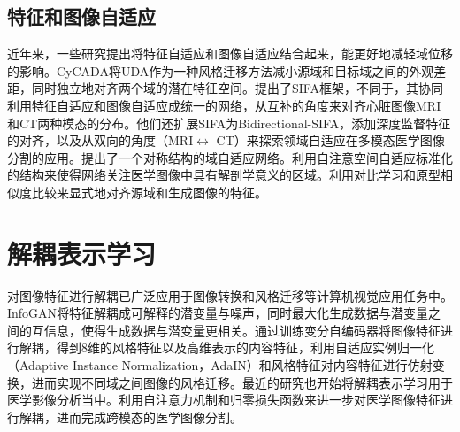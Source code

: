 \subsection{特征和图像自适应}
近年来，一些研究提出将特征自适应和图像自适应结合起来，能更好地减轻域位移的影响\cite{hoffman2018cycada,chen2019synergistic}。CyCADA\cite{hoffman2018cycada}将UDA作为一种风格迁移方法减小源域和目标域之间的外观差距，同时独立地对齐两个域的潜在特征空间。\citeauthor{chen2019synergistic}\cite{chen2019synergistic}提出了SIFA框架，不同于\cite{hoffman2018cycada}，其协同利用特征自适应和图像自适应成统一的网络，从互补的角度来对齐心脏图像MRI和CT两种模态的分布。他们还扩展SIFA为Bidirectional-SIFA\cite{chen2020unsupervised}，添加深度监督特征的对齐，以及从双向的角度（MRI$\leftrightarrow$ CT）来探索领域自适应在多模态医学图像分割的应用。\citeauthor{han2021deep}\cite{han2021deep}提出了一个对称结构的域自适应网络。\citeauthor{tomar2021self}\cite{tomar2021self}利用自注意空间自适应标准化的结构来使得网络关注医学图像中具有解剖学意义的区域。\citeauthor{ye2021unsupervised}\cite{ye2021unsupervised}利用对比学习和原型相似度比较来显式地对齐源域和生成图像的特征。

\section{解耦表示学习}
对图像特征进行解耦已广泛应用于图像转换和风格迁移等计算机视觉应用任务中\cite{DRIT, DRIT_plus}。InfoGAN\cite{chen2016infogan}将特征解耦成可解释的潜变量与噪声，同时最大化生成数据与潜变量之间的互信息，使得生成数据与潜变量更相关。\citeauthor{yang2019unsupervised}\cite{yang2019unsupervised}通过训练变分自编码器将图像特征进行解耦，得到8维的风格特征以及高维表示的内容特征，利用自适应实例归一化（Adaptive Instance Normalization，AdaIN）和风格特征对内容特征进行仿射变换，进而实现不同域之间图像的风格迁移。最近的研究也开始将解耦表示学习用于医学影像分析当中\cite{chartsias2019disentangled,chen2019robust,pei2021disentangle}。\citeauthor{pei2021disentangle}\cite{pei2021disentangle}利用自注意力机制和归零损失函数来进一步对医学图像特征进行解耦，进而完成跨模态的医学图像分割。


